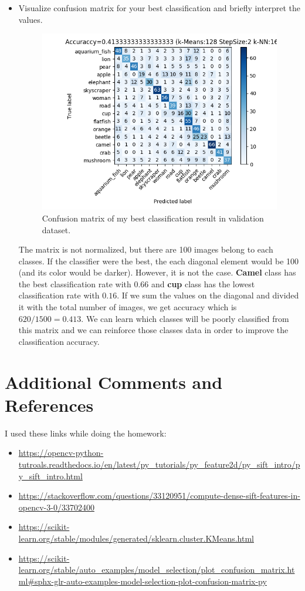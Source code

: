 \documentclass[12pt]{article}
\begin{document}
\begin{itemize}
        \item Visualize confusion matrix for your best classification and briefly interpret the values.
        
        \begin{figure}[!h]
			\centering
			\includegraphics[width=1\textwidth]{Figure_1-1.png}
			\caption{Confusion matrix of my best classification result in validation dataset.}
		\end{figure}
		
		The matrix is not normalized, but there are 100 images belong to each classes. If the classifier were the best, the each diagonal element would be 100 (and its color would be darker). However, it is not the case. \textbf{Camel} class has the best classification rate with $0.66$ and \textbf{cup} class has the lowest classification rate with $0.16$. If we sum the values on the diagonal and divided it with the total number of images, we get accuracy which is $620/1500=0.413$. We can learn which classes will be poorly classified from this matrix and we can reinforce those classes data in order to improve the classification accuracy.
    \end{itemize}

\section{Additional Comments and References}
	I used these links while doing the homework:
	
	\begin{itemize}
		\item\url{https://opencv-python-tutroals.readthedocs.io/en/latest/py_tutorials/py_feature2d/py_sift_intro/py_sift_intro.html}
		\item\url{https://stackoverflow.com/questions/33120951/compute-dense-sift-features-in-opencv-3-0/33702400}
		\item\url{https://scikit-learn.org/stable/modules/generated/sklearn.cluster.KMeans.html}
		\item\url{https://scikit-learn.org/stable/auto_examples/model_selection/plot_confusion_matrix.html#sphx-glr-auto-examples-model-selection-plot-confusion-matrix-py}
	\end{itemize}
\end{document}
